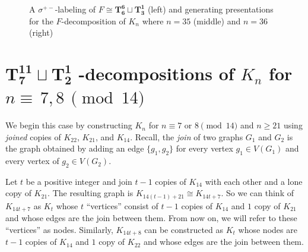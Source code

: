 \documentclass{dmgt}
\begin{document}
\begin{figure}[H]
    \caption{A $\sigma^{+-}$-labeling of $F \cong\mathbf{T_{6}^{6}} \sqcup \mathbf{T_{3}^{1}}$ (left) and generating presentations for the $F$-decomposition of $K_{n}$ where $n=35$ (middle) and $n=36$ (right)}
    \label{fig:7mod14example}
\end{figure}
\newpage
\section{$\mathbf{T_{7}^{11}}\sqcup\mathbf{T_{2}^{1}}$ -decompositions of $K_{n}$ for $n\equiv\,7,8\,\pmod{14}$} \label{sec:star}

We begin this case by constructing $K_{n}$ for $n \equiv 7 \textrm{ or } 8 \pmod{14}$ and $n\geq 21$ using \textit{joined} copies of $K_{22}$, $K_{21}$, and $K_{14}$. Recall, the \textit{join} of two graphs $G_{1}$ and $G_{2}$ is the graph obtained by adding an edge $\{g_1,g_2\}$ for every vertex $g_1 \in V(G_{1})$ and every vertex of $g_2 \in V(G_{2})$.

Let $t$ be a positive integer and join $t-1$ copies of $K_{14}$ with each other and a lone copy of $K_{21}$. The resulting graph is $K_{14(t-1)+21} \cong K_{14t+7}$. So we can think of $K_{14t+7}$ as $K_{t}$ whose $t$ ``vertices'' consist of $t-1$ copies of $K_{14}$ and $1$ copy of $K_{21}$ and whose edges are the join between them. From now on, we will refer to these ``vertices'' as nodes. Similarly, $K_{14t+8}$ can be constructed as $K_{t}$ whose nodes are $t-1$ copies of $K_{14}$ and $1$ copy of $K_{22}$ and whose edges are the join between them.
\end{document}

